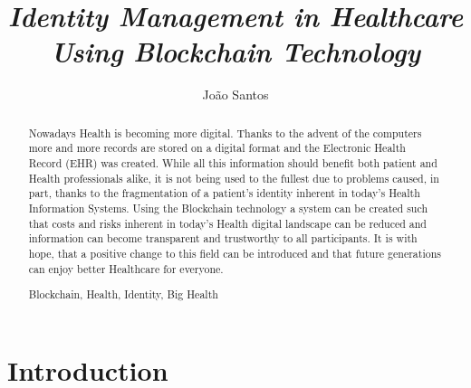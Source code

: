 \documentclass[notitlepage]{llncs}
\newcommand{\keywords}[1]{\par\addvspace\baselineskip
\noindent\keywordname\enspace\ignorespaces#1}
\begin{document}
\title{%
\textit{Identity Management in Healthcare Using Blockchain Technology}}

\author{%
João Santos}


{\def\addcontentsline#1#2#3{}\maketitle}



\begin{abstract}
Nowadays Health is becoming more digital. Thanks to the advent of the computers more and more records are stored on a digital format and the Electronic Health Record (EHR) was created. While all this information should benefit both patient and Health professionals alike, it is not being used to the fullest due to problems caused, in part, thanks to the fragmentation of a patient's identity inherent in today's Health Information Systems. Using the Blockchain technology a system can be created such that costs and risks inherent in today's Health digital landscape can be reduced and information can become transparent and trustworthy to all participants. It is with hope, that a positive change to this field can be introduced and that future generations can enjoy better Healthcare for everyone.
\keywords{Blockchain, Health, Identity, Big Health}
\end{abstract}


\section{Introduction}
\end{document}
